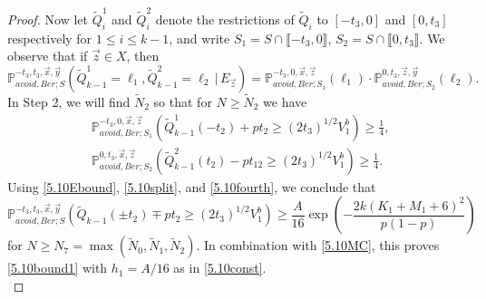 \begin{proof}
	Now let $\tilde{Q}_i^1$ and $\tilde{Q}_i^2$ denote the restrictions of $\tilde{Q}_i$ to $[-t_3,0]$ and $[0,t_3]$ respectively for $1\leq i\leq k-1$, and write $S_1 = S\cap\llbracket -t_3,0\rrbracket$, $S_2 = S\cap\llbracket 0, t_3\rrbracket$. We observe that if $\vec{z}\in X$, then
	\begin{equation}\label{5.10split}
	\mathbb{P}^{-t_3,t_3,\vec{x},\vec{y}}_{avoid,Ber;S}\left(\tilde{Q}^1_{k-1} = \ell_1, \tilde{Q}^2_{k-1} = \ell_2 \, |\, E_{\vec{z}}\right) = \mathbb{P}^{-t_3,0,\vec{x},\vec{z}}_{avoid,Ber;S_1}(\ell_1)\cdot\mathbb{P}^{0,t_3,\vec{z},\vec{y}}_{avoid,Ber;S_2}(\ell_2).
	\end{equation}
	In Step 2, we will find $\tilde{N}_2$ so that for $N\geq\tilde{N}_2$ we have
	\begin{equation}\label{5.10fourth}
	\begin{split}
	&\mathbb{P}^{-t_3,0,\vec{x},\vec{z}}_{avoid,Ber;S_1}\left(\tilde{Q}^1_{k-1}(-t_2) + pt_2 \geq (2t_3)^{1/2}V_1^b\right) \geq \frac{1}{4},\\
	&\mathbb{P}^{0,t_3,\vec{x},\vec{z}}_{avoid,Ber;S_2}\left(\tilde{Q}^2_{k-1}(t_2) - pt_{12} \geq (2t_3)^{1/2}V_1^b\right) \geq \frac{1}{4}.
	\end{split}
	\end{equation}
	Using \eqref{5.10Ebound}, \eqref{5.10split}, and \eqref{5.10fourth}, we conclude that
	\[
	\mathbb{P}^{-t_3,t_3,\vec{x},\vec{y}}_{avoid, Ber;S}\left(\tilde{Q}_{k-1}(\pm t_2) \mp pt_2 \geq (2t_3)^{1/2}V_1^b\right) \geq \frac{A}{16}\exp\left(-\frac{2k(K_1+M_1+6)^2}{p(1-p)}\right)
	\]
	for $N\geq N_7 = \max(\tilde{N}_0,\tilde{N}_1,\tilde{N}_2)$. In combination with \eqref{5.10MC}, this proves \eqref{5.10bound1} with $h_1 = A/16$ as in \eqref{5.10const}.\\
	

\end{proof}
